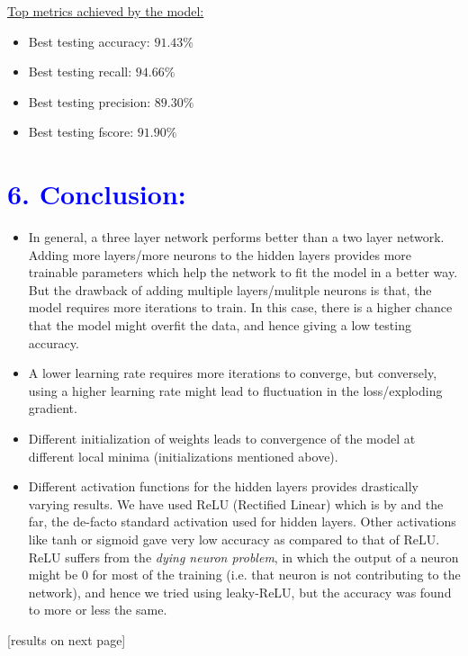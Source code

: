 \documentclass[a4paper,10pt,twocolumn]{article}
\begin{document}
\newline
\newline
\newline
\newline
\underline{Top metrics achieved by the model:}
\begin{itemize}
\item{Best testing accuracy: $91.43\%$}
\item{Best testing recall: $94.66\%$}
\item{Best testing precision: $89.30\%$}
\item{Best testing fscore: $91.90\%$}
\end{itemize}

\section*{\textcolor{blue}{6. Conclusion:}}
\begin{itemize}
\item{In general, a three layer network performs better than a two layer network. Adding more layers/more neurons to the hidden layers provides more trainable parameters which help the network to fit the model in a better way. But the drawback of adding multiple layers/mulitple neurons is that, the model requires more iterations to train. In this case, there is a higher chance that the model might overfit the data, and hence giving a low testing accuracy.}
\item{A lower learning rate requires more iterations to converge, but conversely, using a higher learning rate might lead to fluctuation in the loss/exploding gradient.}
\item{Different initialization of weights leads to convergence of the model at different local minima (initializations mentioned above).}
\item{Different activation functions for the hidden layers provides drastically varying results. We	 have used ReLU (Rectified Linear) which is by and the far, the de-facto standard activation used for hidden layers. Other activations like tanh or sigmoid gave very low accuracy as compared to that of ReLU. ReLU suffers from the \emph{dying neuron problem}, in which the output of a neuron might be 0 for most of the training (i.e. that neuron is not contributing to the network), and hence we tried using leaky-ReLU, but the accuracy was found to more or less the same.}
\end{itemize}
[results on next page]
\end{document}
